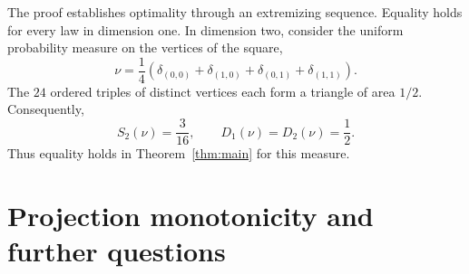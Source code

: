 \documentclass[11pt]{article}
\theoremstyle{remark}
\begin{document}
\begin{aiblock}
The proof establishes optimality through an extremizing sequence. Equality holds for every law in dimension one. In dimension two, consider the uniform probability measure on the vertices of the square,
$$
\nu=\frac14\left(
\delta_{(0,0)}+\delta_{(1,0)}
+\delta_{(0,1)}+\delta_{(1,1)}
\right).
$$
The $24$ ordered triples of distinct vertices each form a triangle of area $1/2$. Consequently,
$$
S_2(\nu)=\frac{3}{16},
\qquad
D_1(\nu)=D_2(\nu)=\frac12.
$$
Thus equality holds in Theorem~\ref{thm:main} for this measure.

\end{aiblock}




\section{Projection monotonicity and further questions}
\label{sec:projection-monotonicity}
\end{document}
